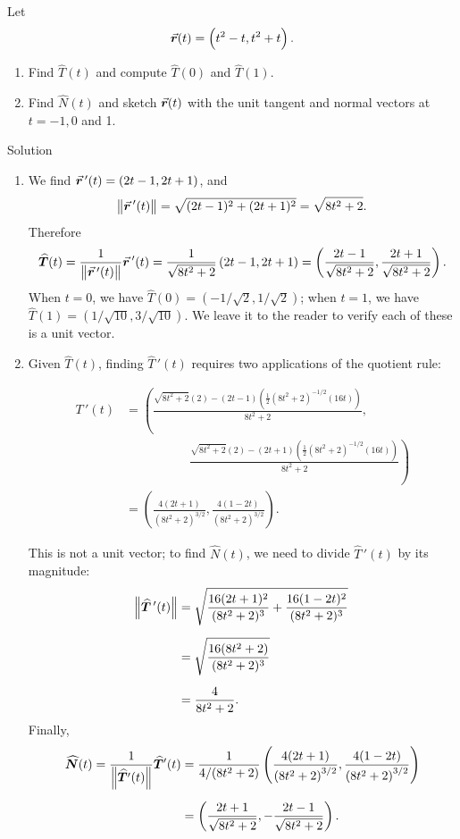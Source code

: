 \begin{example}\label{ex_tannorm2}
Let $$\vrt=\left( t^2-t,t^2+t\right).$$
\begin{enumerate}
\item Find $\widehat T(t)$ and compute $\widehat T(0)$ and $\widehat T(1)$.
\item Find $\widehat N(t)$ and sketch $\vrt$ with the unit tangent and normal vectors at $t=-1,0$ and 1.
\end{enumerate}

Solution 

\begin{enumerate}
\item We find $\vrp(t) = \left( 2t-1,2t+1\right)$, and $$\norm{\vrp(t)} = \sqrt{(2t-1)^2+(2t+1)^2} = \sqrt{8t^2+2}.$$
Therefore $$\widehat T(t) =\frac{1}{\rule{0pt}{9pt}\norm{\vrp(t)}}\vrp(t)= \frac{1}{\sqrt{8t^2+2}}\left( 2t-1,2t+1\right) = \left( \frac{2t-1}{\sqrt{8t^2+2}},\frac{2t+1}{\sqrt{8t^2+2}}\right).$$
When $t=0$, we have $\widehat T(0) = \left( -1/\sqrt{2},1/\sqrt{2}\right)$; when $t=1$, we have $\widehat T(1) = \left( 1/\sqrt{10}, 3/\sqrt{10}\right).$ We leave it to the reader to verify each of these is a unit vector. 
\item Given $\widehat T(t)$, finding $\widehat T\,'(t)$ requires two applications of the quotient rule:

\begin{align*}
T\,'(t) &= \left( \frac{\sqrt{8t^2+2}(2)-(2t-1)\left(\frac12(8t^2+2)^{-1/2}(16t)\right)}{8t^2+2},\right.\\
		&\phantom{xxxxxxxxx} \left.\frac{\sqrt{8t^2+2}(2)-(2t+1)\left(\frac12(8t^2+2)^{-1/2}(16t)\right)}{8t^2+2} \right) \\[0.2cm]
				&= \left( \frac{4 (2 t+1)}{\left(8 t^2+2\right)^{3/2}},\frac{4
   (1-2 t)}{\left(8 t^2+2\right)^{3/2}}\right).
\end{align*}

This is not a unit vector; to find $\widehat N(t)$, we need to divide $\widehat T\,'(t)$ by its magnitude:
\allowdisplaybreaks
\begin{align*}
\norm{\widehat T\,'(t)} &= \sqrt{\frac{16(2t+1)^2}{(8t^2+2)^3}+\frac{16(1-2t)^2}{(8t^2+2)^3}}\\[0.2cm]
					&= \sqrt{\frac{16(8t^2+2)}{(8t^2+2)^3}}\\[0.2cm]
					&= \frac{4}{8t^2+2}.
\end{align*}
Finally, 
\begin{align*}
\widehat N(t) =\frac{1}{\rule{0pt}{9pt}\norm{\widehat T'(t)}}\widehat T'(t)&= \frac1{4/(8t^2+2)}\left( \frac{4 (2 t+1)}{\left(8 t^2+2\right)^{3/2}},\frac{4
   (1-2 t)}{\left(8 t^2+2\right)^{3/2}}\right)\\[0.2cm]
	&= \left( \frac{2t+1}{\sqrt{8t^2+2}},-\frac{2t-1}{\sqrt{8t^2+2}}\right).
\end{align*}


\end{enumerate}
\end{example}
